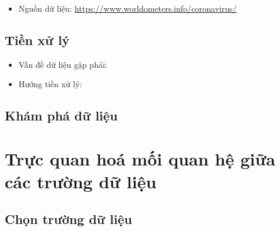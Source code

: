 \documentclass[a4paper, 12pt]{article}
\begin{document}
    \begin{itemize}
        \item Nguồn dữ liệu: \url{https://www.worldometers.info/coronavirus/}
    \end{itemize}

    \subsection{Tiền xử lý}

    \begin{itemize}
        \item Vấn đề dữ liệu gặp phải:
        \item Hướng tiền xử lý:
    \end{itemize}

    \subsection{Khám phá dữ liệu}
    \clearpage 

    \section{Trực quan hoá mối quan hệ giữa các trường dữ liệu}

    \subsection{Chọn trường dữ liệu}
\end{document}
